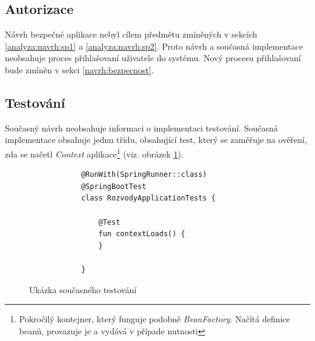         \subsection{Autorizace}
            Návrh bezpečné aplikace nebyl cílem předmětu zmíněných v sekcích \ref{analyza:navrh:sp1} a \ref{analyza:navrh:sp2}. Proto návrh a současná implementace neobsahuje proces přihlašovaní uživatele do systému. Nový procesu přihlašovaní bude zmíněn v sekci \ref{navrh:bezpecnost}.
        
        \subsection{Testování}
            Současný návrh neobsahuje informaci o implementaci testování. Současná implementace obsahuje jednu třídu, obsahující test, který se zaměřuje na ověření, zda se načetl {\textit{Context} aplikace}\footnote{Pokročilý kontejner, který funguje podobně \textit{BeanFactory}. Načítá definice beanů, provazuje je a vydává v případe nutnosti} (viz. obrázek \ref{code:test-context-loads1}).
            \begin{figure}
            \begin{verbatim}
            @RunWith(SpringRunner::class)
            @SpringBootTest
            class RozvodyApplicationTests {

                @Test
                fun contextLoads() {
                }

            }
            \end{verbatim}
            \caption{Ukázka současného testování} 
            \label{code:test-context-loads1}
            \end{figure}